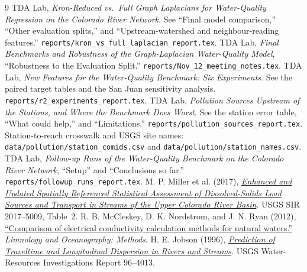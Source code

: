 \documentclass[11pt,letterpaper]{article}
\begin{document}
\begingroup\small
\setlength{\parskip}{0pt}
\renewcommand{\refname}{Evidence and further reading}
\begin{thebibliography}{9}\setlength{\itemsep}{2pt}\setlength{\parskip}{0pt}
 TDA Lab, \emph{Kron-Reduced vs.\ Full Graph Laplacians for Water-Quality Regression on the Colorado River Network}. See ``Final model comparison,'' ``Other evaluation splits,'' and ``Upstream-watershed and neighbour-reading features.'' \nolinkurl{reports/kron_vs_full_laplacian_report.tex}.
 TDA Lab, \emph{Final Benchmarks and Robustness of the Graph-Laplacian Water-Quality Model}, ``Robustness to the Evaluation Split.'' \nolinkurl{reports/Nov_12_meeting_notes.tex}.
 TDA Lab, \emph{New Features for the Water-Quality Benchmark: Six Experiments}. See the paired target tables and the San Juan sensitivity analysis. \nolinkurl{reports/r2_experiments_report.tex}.
 TDA Lab, \emph{Pollution Sources Upstream of the Stations, and Where the Benchmark Does Worst}. See the station error table, ``What could help,'' and ``Limitations.'' \nolinkurl{reports/pollution_sources_report.tex}.
 Station-to-reach crosswalk and USGS site names: \nolinkurl{data/pollution/station_comids.csv} and \nolinkurl{data/pollution/station_names.csv}.
 TDA Lab, \emph{Follow-up Runs of the Water-Quality Benchmark on the Colorado River Network}, ``Setup'' and ``Conclusions so far.'' \nolinkurl{reports/followup_runs_report.tex}.
 M. P. Miller et al. (2017), \href{https://pubs.usgs.gov/sir/2017/5009/sir20175009.pdf}{\emph{Enhanced and Updated Spatially Referenced Statistical Assessment of Dissolved-Solids Load Sources and Transport in Streams of the Upper Colorado River Basin}}. USGS SIR 2017--5009, Table~2.
 R. B. McCleskey, D. K. Nordstrom, and J. N. Ryan (2012), \href{https://www.usgs.gov/publications/comparison-electrical-conductivity-calculation-methods-natural-waters}{``Comparison of electrical conductivity calculation methods for natural waters.''} \emph{Limnology and Oceanography: Methods}.
 H. E. Jobson (1996), \href{https://pubs.usgs.gov/wri/1996/4013/report.pdf}{\emph{Prediction of Traveltime and Longitudinal Dispersion in Rivers and Streams}}. USGS Water-Resources Investigations Report 96--4013.
\end{thebibliography}
\endgroup
\end{document}
